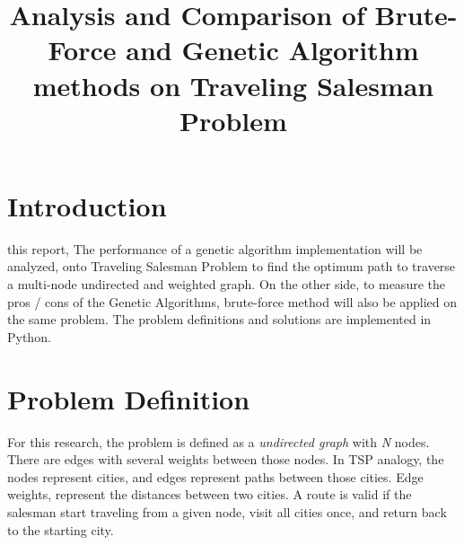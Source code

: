 \documentclass[journal,transmag]{IEEEtran}
\begin{document}
    \title{ Analysis and Comparison of Brute-Force and Genetic Algorithm methods
        on Traveling Salesman Problem }

    \author{   }



    \maketitle
    \IEEEdisplaynontitleabstractindextext \IEEEpeerreviewmaketitle

    \section{Introduction}

     this report, The performance of a genetic algorithm
    implementation will be analyzed, onto Traveling Salesman Problem to find
    the optimum path to traverse a multi-node undirected and weighted graph. On
    the other side, to measure the pros / cons of the Genetic Algorithms,
    brute-force method will also be applied on the same problem. The problem
    definitions and solutions are implemented in Python.

    \section{Problem Definition}

    For this research, the problem is defined as a \textit{undirected graph}
    with \textit{N} nodes. There are edges with several weights between those nodes. In
    TSP analogy, the nodes represent cities, and edges represent paths between
    those cities. Edge weights, represent the distances between two cities. A
    route is valid if the salesman start traveling from a given node, visit all
    cities once, and return back to the starting city.
\end{document}
